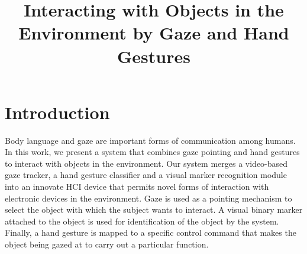\documentclass[jou,a4paper,notxfonts]{apa}
\title{Interacting with Objects in the Environment by Gaze and Hand Gestures}
\begin{document}
\maketitle

\thispagestyle{plain}

\section{Introduction} 
Body language and gaze are important forms of communication among humans. In this work, we present a system that
combines gaze pointing and hand gestures to interact with objects in the environment. Our system merges a video-based gaze
tracker, a hand gesture classifier and a visual marker recognition module into an innovate HCI device that permits novel
forms of interaction with electronic devices in the environment. Gaze is used as a pointing mechanism to select the
object with which the subject wants to interact. A visual binary marker attached to the object is used for
identification of the object by the system. Finally, a hand gesture is mapped to a specific control command that makes
the object being gazed at to carry out a particular function.
\end{document}
